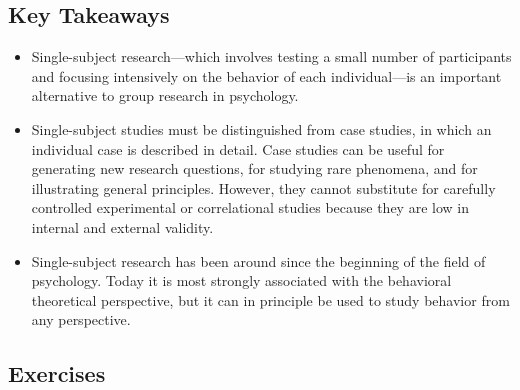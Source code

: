 \subsection{Key Takeaways}

\begin{fullwidth}

\begin{itemize}


\item Single-subject research---which involves testing a small number of participants and focusing intensively on the behavior of each individual---is an important alternative to group research in psychology.

\item Single-subject studies must be distinguished from case studies, in which an individual case is described in detail. Case studies can be useful for generating new research questions, for studying rare phenomena, and for illustrating general principles. However, they cannot substitute for carefully controlled experimental or correlational studies because they are low in internal and external validity.

\item Single-subject research has been around since the beginning of the field of psychology. Today it is most strongly associated with the behavioral theoretical perspective, but it can in principle be used to study behavior from any perspective.


\end{itemize}

\end{fullwidth}



\subsection{Exercises}

